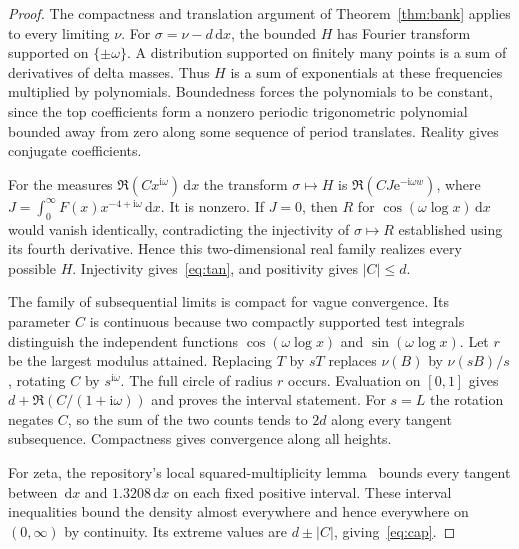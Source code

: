 \documentclass[11pt,letterpaper]{article}
\newcommand{\dd}{\,\mathrm d}
\newcommand{\ee}{\mathrm e}
\newcommand{\ii}{\mathrm i}
\newcommand{\abs}[1]{\lvert#1\rvert}
\begin{document}
\begin{proof}
The compactness and translation argument of Theorem~\ref{thm:bank} applies to every limiting $\nu$. For $\sigma=\nu-d\dd x$, the bounded $H$ has Fourier transform supported on $\{\pm\omega\}$. A distribution supported on finitely many points is a sum of derivatives of delta masses. Thus $H$ is a sum of exponentials at these frequencies multiplied by polynomials. Boundedness forces the polynomials to be constant, since the top coefficients form a nonzero periodic trigonometric polynomial bounded away from zero along some sequence of period translates. Reality gives conjugate coefficients.

For the measures $\Re(Cx^{\ii\omega})\dd x$ the transform $\sigma\mapsto H$ is $\Re(CJ\ee^{-\ii\omega w})$, where $J=\int_0^\infty F(x)x^{-4+\ii\omega}\dd x$. It is nonzero. If $J=0$, then $R$ for $\cos(\omega\log x)\dd x$ would vanish identically, contradicting the injectivity of $\sigma\mapsto R$ established using its fourth derivative. Hence this two-dimensional real family realizes every possible $H$. Injectivity gives~\eqref{eq:tan}, and positivity gives $\abs C\le d$.

The family of subsequential limits is compact for vague convergence. Its parameter $C$ is continuous because two compactly supported test integrals distinguish the independent functions $\cos(\omega\log x)$ and $\sin(\omega\log x)$. Let $r$ be the largest modulus attained. Replacing $T$ by $sT$ replaces $\nu(B)$ by $\nu(sB)/s$, rotating $C$ by $s^{\ii\omega}$. The full circle of radius $r$ occurs. Evaluation on $[0,1]$ gives $d+\Re(C/(1+\ii\omega))$ and proves the interval statement. For $s=L$ the rotation negates $C$, so the sum of the two counts tends to $2d$ along every tangent subsequence. Compactness gives convergence along all heights.

For zeta, the repository's local squared-multiplicity lemma~\cite{ProveIt} bounds every tangent between $\dd x$ and $1.3208\dd x$ on each fixed positive interval. These interval inequalities bound the density almost everywhere and hence everywhere on $(0,\infty)$ by continuity. Its extreme values are $d\pm\abs C$, giving~\eqref{eq:cap}.
\end{proof}

\end{document}

